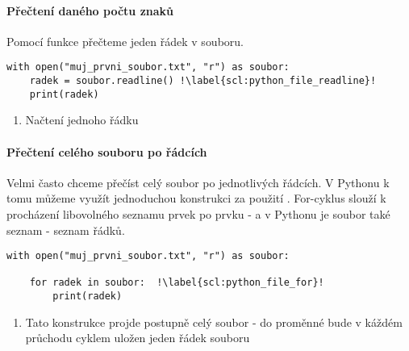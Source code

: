 \paragraph{Přečtení daného počtu znaků}
Pomocí funkce  přečteme jeden řádek v souboru.

\begin{minipage}[t]{.45\textwidth}
\begin{code}
\begin{verbatim}
with open("muj_prvni_soubor.txt", "r") as soubor: 
	radek = soubor.readline() !\label{scl:python_file_readline}!
	print(radek)
\end{verbatim}

\label{code:python_file_readline}
\end{code}
\end{minipage}
\begin{minipage}[t]{.45\textwidth}
\begin{enumerate}
\vspace{0.5cm}
\item[ř. \ref{scl:python_file_readline}:] Načtení jednoho řádku
\end{enumerate}
\end{minipage}

\paragraph{Přečtení celého souboru po řádcích}
Velmi často chceme přečíst celý soubor po jednotlivých řádcích. V Pythonu k tomu můžeme využít jednoduchou konstrukci za použití . For-cyklus slouží k procházení libovolného seznamu prvek po prvku - a v Pythonu je soubor také seznam - seznam řádků.

\begin{minipage}[t]{.45\textwidth}
\begin{code}
\begin{verbatim}
with open("muj_prvni_soubor.txt", "r") as soubor: 

	for radek in soubor:  !\label{scl:python_file_for}!
		print(radek)
\end{verbatim}

\label{code:python_file_for}
\end{code}
\end{minipage}
\begin{minipage}[t]{.45\textwidth}
\begin{enumerate}
\vspace{0.5cm}
\item[ř. \ref{scl:python_file_for}:] Tato konstrukce projde postupně celý soubor - do proměnné  bude v káždém průchodu cyklem uložen jeden řádek souboru
\end{enumerate}
\end{minipage}

